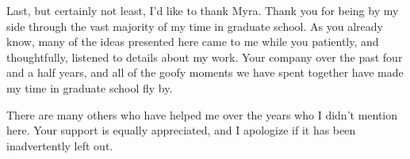 Last, but certainly not least, I'd like to thank Myra.  Thank you for being by my side through the vast majority of my time in graduate school.  As you already know, many of the ideas presented here came to me while you patiently, and thoughtfully, listened to details about my work.  Your company over the past four and a half years, and all of the goofy moments we have spent together have made my time in graduate school fly by.
 
There are many others who have helped me over the years who I didn't mention here.  Your support is equally appreciated, and I apologize if it has been inadvertently left out.

    
    
